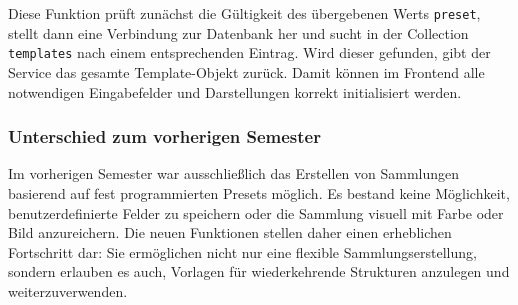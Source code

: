 Diese Funktion prüft zunächst die Gültigkeit des übergebenen Werts \texttt{preset}, stellt dann eine Verbindung zur Datenbank her und sucht in der Collection \texttt{templates} nach einem entsprechenden Eintrag.
Wird dieser gefunden, gibt der Service das gesamte Template-Objekt zurück.
Damit können im Frontend alle notwendigen Eingabefelder und Darstellungen korrekt initialisiert werden.

\subsubsection{Unterschied zum vorherigen Semester}\label{subsubsec:comparison-previous}

Im vorherigen Semester war ausschließlich das Erstellen von Sammlungen basierend auf fest programmierten Presets möglich.
Es bestand keine Möglichkeit, benutzerdefinierte Felder zu speichern oder die Sammlung visuell mit Farbe oder Bild anzureichern.
Die neuen Funktionen stellen daher einen erheblichen Fortschritt dar: Sie ermöglichen nicht nur eine flexible Sammlungserstellung, sondern erlauben es auch, Vorlagen für wiederkehrende Strukturen anzulegen und weiterzuverwenden.